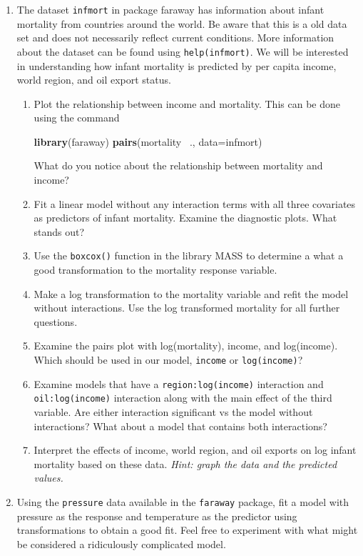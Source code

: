 \documentclass[]{book}
\newenvironment{Shaded}{\begin{snugshade}}{\end{snugshade}}
\newcommand{\KeywordTok}[1]{\textcolor[rgb]{0.13,0.29,0.53}{\textbf{{#1}}}}
\newcommand{\DataTypeTok}[1]{\textcolor[rgb]{0.13,0.29,0.53}{{#1}}}
\newcommand{\NormalTok}[1]{{#1}}
\theoremstyle{definition}
\theoremstyle{definition}
\theoremstyle{remark}
\begin{document}
\begin{enumerate}
\def\labelenumi{\arabic{enumi}.}
\item
  The dataset \texttt{infmort} in package faraway has information about
  infant mortality from countries around the world. Be aware that this
  is a old data set and does not necessarily reflect current conditions.
  More information about the dataset can be found using
  \texttt{help(infmort)}. We will be interested in understanding how
  infant mortality is predicted by per capita income, world region, and
  oil export status.

  \begin{enumerate}
  \def\labelenumii{\alph{enumii}.}
  \item
    Plot the relationship between income and mortality. This can be done
    using the command

\begin{Shaded}
\begin{Highlighting}[]
\KeywordTok{library}\NormalTok{(faraway)}
\KeywordTok{pairs}\NormalTok{(mortality ~., }\DataTypeTok{data=}\NormalTok{infmort)}
\end{Highlighting}
\end{Shaded}

    What do you notice about the relationship between mortality and
    income?
  \item
    Fit a linear model without any interaction terms with all three
    covariates as predictors of infant mortality. Examine the diagnostic
    plots. What stands out?
  \item
    Use the \texttt{boxcox()} function in the library MASS to determine
    a what a good transformation to the mortality response variable.
  \item
    Make a log transformation to the mortality variable and refit the
    model without interactions. Use the log transformed mortality for
    all further questions.
  \item
    Examine the pairs plot with log(mortality), income, and log(income).
    Which should be used in our model, \texttt{income} or
    \texttt{log(income)}?
  \item
    Examine models that have a \texttt{region:log(income)} interaction
    and \texttt{oil:log(income)} interaction along with the main effect
    of the third variable. Are either interaction significant vs the
    model without interactions? What about a model that contains both
    interactions?
  \item
    Interpret the effects of income, world region, and oil exports on
    log infant mortality based on these data. \emph{Hint: graph the data
    and the predicted values.}
  \end{enumerate}
\item
  Using the \texttt{pressure} data available in the \texttt{faraway}
  package, fit a model with pressure as the response and temperature as
  the predictor using transformations to obtain a good fit. Feel free to
  experiment with what might be considered a ridiculously complicated
  model.


\end{enumerate}
\end{document}
